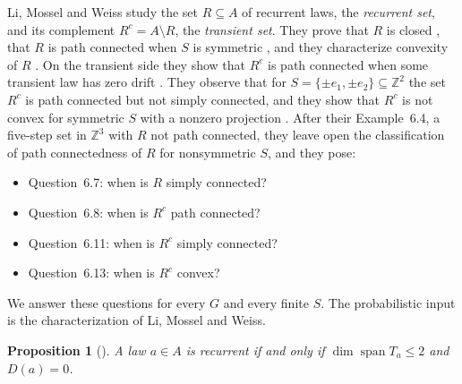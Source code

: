 \documentclass[11pt]{article}
\newtheorem{proposition}[theorem]{Proposition}
\theoremstyle{remark}
\DeclareMathOperator{\spn}{span}
\newcommand{\Z}{\mathbb{Z}}
\begin{document}
Li, Mossel and Weiss \cite[Section~6]{LMW} study the set $R\subseteq A$ of recurrent laws, the \emph{recurrent set}, and
its complement $R^c=A\setminus R$, the \emph{transient set}. They prove that $R$ is closed \cite[Theorem~6.2]{LMW}, that $R$ is path
connected when $S$ is symmetric \cite[Theorem~6.3]{LMW}, and they characterize convexity of $R$ \cite[Theorem~6.5,
Corollary~6.6]{LMW}. On the transient side they show that $R^c$ is path connected when some transient law has zero
drift \cite[Theorem~6.9, Corollary~6.10]{LMW}. They observe that for $S=\{\pm e_1,\pm e_2\}\subseteq\Z^2$ the set
$R^c$ is path connected but not simply connected, and they show that $R^c$ is not convex for symmetric $S$ with a nonzero projection
\cite[Proposition~6.12]{LMW}. After their Example~6.4, a five-step set in $\Z^3$ with $R$ not path connected, they
leave open the classification of path connectedness of $R$ for nonsymmetric $S$, and they pose:
\begin{itemize}[nosep]
\item Question~6.7: when is $R$ simply connected?
\item Question~6.8: when is $R^c$ path connected?
\item Question~6.11: when is $R^c$ simply connected?
\item Question~6.13: when is $R^c$ convex?
\end{itemize}
We answer these questions for every $G$ and every finite $S$. The probabilistic input is the characterization of Li,
Mossel and Weiss.

\begin{proposition}[{\cite[Proposition~6.1]{LMW}}]\label{prop:LMW}
A law $a\in A$ is recurrent if and only if $\dim\spn T_a\le 2$ and $D(a)=0$.
\end{proposition}
\end{document}
